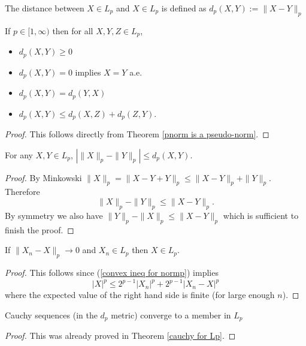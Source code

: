 \begin{definition}[{\bf distances in $L_p$}]
The distance between $X\in L_p$ and $X\in L_p$ is defined as $d_p(X, Y):= \|X-Y\|_p$
\end{definition}

\begin{theorem}
If $p\in [1,\infty)$ then for all $X, Y, Z \in L_p$,
\begin{itemize}
\item $d_p(X,Y) \geq 0$
\item $d_p(X,Y)= 0$ implies $X = Y$ a.e.
\item $d_p(X,Y)= d_p(Y,X)$
\item $d_p(X,Y)\leq d_p(X,Z) + d_p(Z,Y)$.
\end{itemize}
\end{theorem}
\begin{proof}
This follows directly from Theorem \ref{pnorm is a pseudo-norm}.
\end{proof}


\begin{theorem}
\label{Continuity of Lp}
For any $X,Y\in L_p$,
$|\|X\|_p - \|Y\|_p|\leq d_p(X,Y)$.
\end{theorem}
\begin{proof}
By Minkowski $\|X \|_p= \|X -Y +Y\|_p\leq \|X -Y\|_p +\|Y\|_p$. Therefore
\[\|X \|_p -  \|Y\|_p\leq  \|X -Y\|_p. \]
By symmetry we also have $\|Y \|_p -  \|X\|_p\leq  \|X -Y\|_p$
which is sufficient to finish the proof.
\end{proof}



\begin{theorem}[{\bf $L_p$ is closed}]
\label{Lp is closed}
If $\|X_n - X\|_p\rightarrow 0$ and $X_n \in L_p$ then $X\in L_p$.
\end{theorem}
\begin{proof}
This follows since (\ref{convex ineq for normp}) implies
\[ |X|^p \leq 2^{p-1}|X_n|^p +  2^{p-1}|X_n-X|^p  \]
where the expected value of the right hand side is finite (for large enough $n$).
\end{proof}



\begin{theorem}[{\bf $L_p$ is complete}]
Cauchy sequences (in the $d_p$ metric) converge to a member in $L_p$
\end{theorem}
\begin{proof} This was already proved in Theorem \ref{cauchy for Lp}.
\end{proof}


